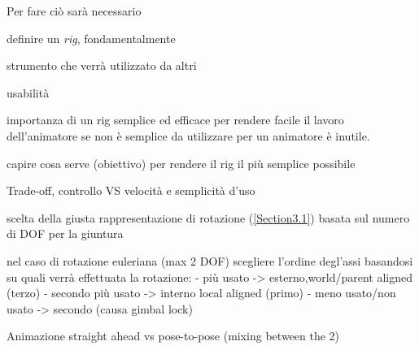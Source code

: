 Per fare ciò sarà necessario 

definire un \emph{rig}, fondamentalmente 

strumento che verrà utilizzato da altri

usabilità

importanza di un rig semplice ed efficace per rendere facile il lavoro dell'animatore
se non è semplice da utilizzare per un animatore è inutile.

capire cosa serve (obiettivo) per rendere il rig il più semplice possibile

Trade-off, controllo VS velocità e semplicità d'uso

scelta della giusta rappresentazione di rotazione (\ref{Section3.1}) basata sul numero di DOF per la giuntura

nel caso di rotazione euleriana (max 2 DOF) scegliere l'ordine degl'assi basandosi su quali verrà effettuata la rotazione:
- più usato -> esterno,world/parent aligned (terzo)
- secondo più usato -> interno local aligned (primo)
- meno usato/non usato -> secondo (causa gimbal lock)

Animazione straight ahead vs pose-to-pose (mixing between the 2)